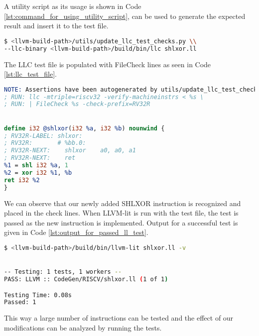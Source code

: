 A utility script as its usage is shown in Code \ref{lst:command_for_using_utility_script}, can be used to generate the expected result and insert it to the test file.

\begin{lstlisting}[language=sh, caption={Command for using utility script}, label={lst:command_for_using_utility_script} ]
$ <llvm-build-path>/utils/update_llc_test_checks.py \\
--llc-binary <llvm-build-path>/build/bin/llc shlxor.ll
\end{lstlisting}

The LLC test file is populated with FileCheck lines as seen in Code \ref{lst:llc_test_file}.

\begin{minipage}{\linewidth}
\begin{lstlisting}[language=llvm,style=nasm, caption={The final LLC test file}, label={lst:llc_test_file} ]
NOTE: Assertions have been autogenerated by utils/update_llc_test_checks.py
; RUN: llc -mtriple=riscv32 -verify-machineinstrs < %s \ 
; RUN: | FileCheck %s -check-prefix=RV32R 


define i32 @shlxor(i32 %a, i32 %b) nounwind { 
; RV32R-LABEL: shlxor:
; RV32R:       # %bb.0:
; RV32R-NEXT:    shlxor    a0, a0, a1
; RV32R-NEXT:    ret
%1 = shl i32 %a, 1 
%2 = xor i32 %1, %b 
ret i32 %2 
} 
\end{lstlisting}
\end{minipage}


We can observe that our newly added SHLXOR instruction is recognized and placed in the check lines. When LLVM-lit is run with the test file, the test is passed as the new instruction is implemented. Output for a successful test is given in Code \ref{lst:output_for_passed_ll_test}.

\begin{lstlisting}[language=sh, caption={Output for successfully passed test}, label={lst:output_for_passed_ll_test} ]
$ <llvm-build-path>/build/bin/llvm-lit shlxor.ll -v


-- Testing: 1 tests, 1 workers --
PASS: LLVM :: CodeGen/RISCV/shlxor.ll (1 of 1)

Testing Time: 0.08s
Passed: 1
\end{lstlisting}

This way a large number of instructions can be tested and the effect of our modifications can be analyzed by running the tests.
